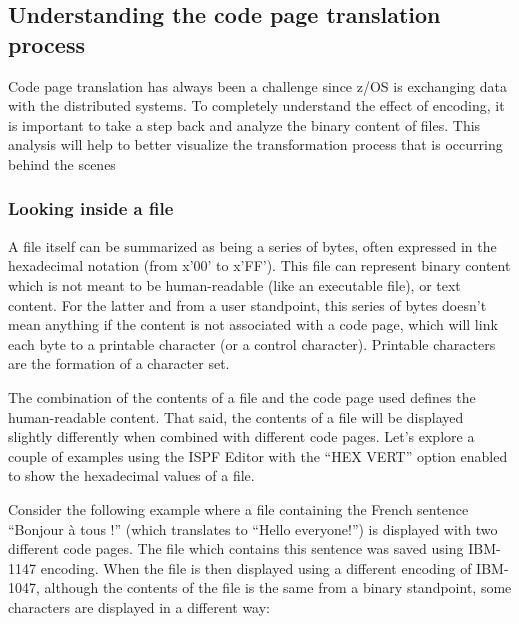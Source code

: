\documentclass[
  letterpaper,
  DIV=11,
  numbers=noendperiod]{scrartcl}
\begin{document}
\hypertarget{understanding-the-code-page-translation-process}{%
\subsection{Understanding the code page translation
process}\label{understanding-the-code-page-translation-process}}

Code page translation has always been a challenge since z/OS is
exchanging data with the distributed systems. To completely understand
the effect of encoding, it is important to take a step back and analyze
the binary content of files. This analysis will help to better visualize
the transformation process that is occurring behind the scenes

\hypertarget{looking-inside-a-file}{%
\subsubsection{Looking inside a file}\label{looking-inside-a-file}}

A file itself can be summarized as being a series of bytes, often
expressed in the hexadecimal notation (from x'00' to x'FF'). This file
can represent binary content which is not meant to be human-readable
(like an executable file), or text content. For the latter and from a
user standpoint, this series of bytes doesn't mean anything if the
content is not associated with a code page, which will link each byte to
a printable character (or a control character). Printable characters are
the formation of a character set.

The combination of the contents of a file and the code page used defines
the human-readable content. That said, the contents of a file will be
displayed slightly differently when combined with different code pages.
Let's explore a couple of examples using the ISPF Editor with the ``HEX
VERT'' option enabled to show the hexadecimal values of a file.

Consider the following example where a file containing the French
sentence ``Bonjour à tous !'' (which translates to ``Hello everyone!'')
is displayed with two different code pages. The file which contains this
sentence was saved using IBM-1147 encoding. When the file is then
displayed using a different encoding of IBM-1047, although the contents
of the file is the same from a binary standpoint, some characters are
displayed in a different way:
\end{document}
